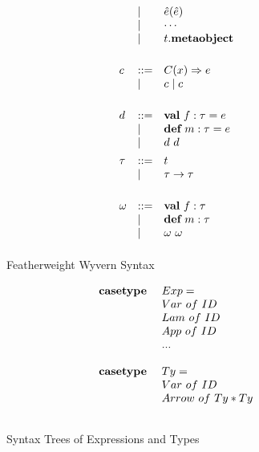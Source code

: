 \begin{figure}
\[\begin{array}{lll}
     & \mathrel{\mid} & \hat{e}(\hat{e}) \\
     & \mathrel{\mid} & \cdots \\
     & \mathrel{\mid} & t.\textbf{metaobject}\\
\\[1ex]
c    & ::= & C(x) \Rightarrow e\\
     & \mathrel{\mid} & c \mathrel{\mid} c\\
	 \\[1ex]
d    & ::= & \textbf{val}~ f:\tau = e \\
     & \mathrel{\mid} & \textbf{def}~ m:\tau = e \\
     & \mathrel{\mid} & d~d
\\[1ex]
\tau & ::= & t\\
     & \mathrel{\mid} & \tau \rightarrow \tau \\
\\[1ex]
\omega   & ::= & \textbf{val}~ f:\tau\\
         & \mathrel{\mid} & \textbf{def}~ m:\tau \\
         & \mathrel{\mid} & \omega~\omega 
\\[1ex]
\end{array}
\]
\caption{Featherweight Wyvern Syntax}
\label{fig:core2-syntax}
\end{figure}


\begin{figure}
\centering
\[
\begin{array}{ll}
\textbf{casetype}\ & Exp=\\
& Var\ of\ ID\\
& Lam\ of\ ID\\
& App\ of\ ID\\
& ...\\
\\
\textbf{casetype}\ & Ty=\\
& Var\ of\ ID\\
& Arrow\ of\ Ty*Ty\\
\\ 
\end{array}
\]
\caption{Syntax Trees of Expressions and Types}
\end{figure}





